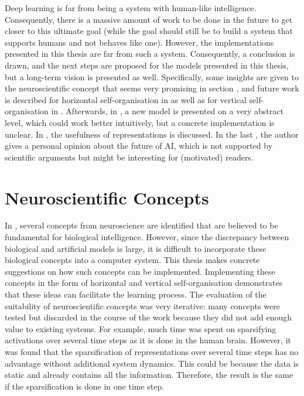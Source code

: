 Deep learning is far from being a system with human-like intelligence. Consequently, there is a massive amount of work to be done in the future to get closer to this ultimate goal (while the goal should still be to build a system that supports humans and not behaves like one). However, the implementations presented in this thesis are far from such a system. Consequently, a conclusion is drawn, and the next steps are proposed for the models presented in this thesis, but a long-term vision is presented as well. Specifically, some insights are given to the neuroscientific concept that seems very promising in section , and future work is described for horizontal self-organisation in  as well as for vertical self-organisation in . Afterwards, in , a new model is presented on a very abstract level, which could work better intuitively, but a concrete implementation is unclear. In , the usefulness of representations is discussed. In the last , the author gives a personal opinion about the future of AI, which is not supported by scientific arguments but might be interesting for (motivated) readers.



\section{Neuroscientific Concepts}
In , several concepts from neuroscience are identified that are believed to be fundamental for biological intelligence. However, since the discrepancy between biological and artificial models is large, it is difficult to incorporate these biological concepts into a computer system. This thesis makes concrete suggestions on how such concepts can be implemented. Implementing these concepts in the form of horizontal and vertical self-organisation demonstrates that these ideas can facilitate the learning process. The evaluation of the suitability of neuroscientific concepts was very iterative: many concepts were tested but discarded in the course of the work because they did not add enough value to existing systems. For example, much time was spent on sparsifying activations over several time steps as it is done in the human brain. However, it was found that the sparsification of representations over several time steps has no advantage without additional system dynamics. This could be because the data is static and already contains all the information. Therefore, the result is the same if the sparsification is done in one time step.

